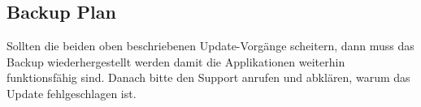 \subsection{Backup Plan}

Sollten die beiden oben beschriebenen Update-Vorgänge scheitern, dann muss das Backup wiederhergestellt werden damit die Applikationen weiterhin funktionsfähig sind. Danach bitte den Support anrufen und abklären, warum das Update fehlgeschlagen ist.





